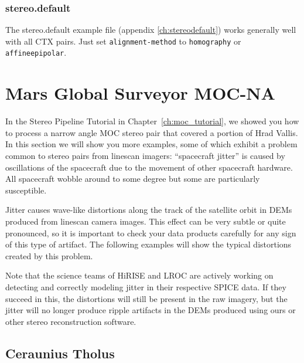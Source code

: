 \subsubsection*{stereo.default}

The stereo.default example file (appendix \ref{ch:stereodefault})
works generally well with all CTX pairs. Just set
\texttt{alignment-method} to \texttt{homography} or
\texttt{affineepipolar}.

\clearpage
\section{Mars Global Surveyor MOC-NA}

In the Stereo Pipeline Tutorial in Chapter~\ref{ch:moc_tutorial}, we
showed you how to process a narrow angle \ac{MOC} stereo pair that
covered a portion of Hrad Vallis. In this section we will show you
more examples, some of which exhibit a problem common to stereo
pairs from linescan imagers: ``spacecraft jitter'' is caused by
oscillations of the spacecraft due to the movement of other spacecraft
hardware.  All spacecraft wobble around to some degree but some are
particularly susceptible.

Jitter causes wave-like distortions along the track of the satellite
orbit in \acp{DEM} produced from linescan camera images.  This effect can
be very subtle or quite pronounced, so it is important to check your
data products carefully for any sign of this type of artifact. The
following examples will show the typical distortions created by this
problem.

Note that the science teams of \ac{HiRISE} and \ac{LROC} are actively
working on detecting and correctly modeling jitter in their respective
SPICE data. If they succeed in this, the distortions will still
be present in the raw imagery, but the jitter will no longer produce
ripple artifacts in the DEMs produced using ours or other stereo
reconstruction software.

\subsection{Ceraunius Tholus}


